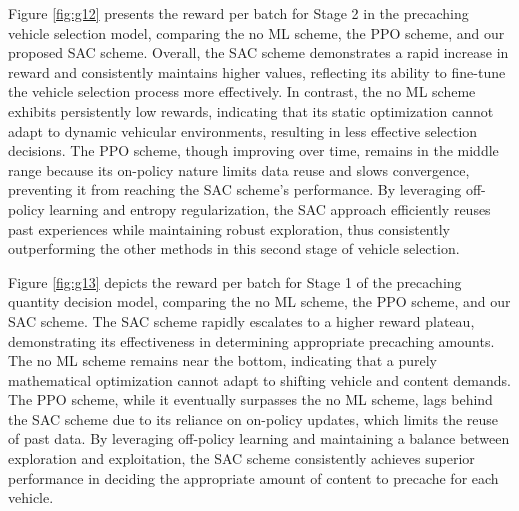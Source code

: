 \documentclass{aims}
\numberwithin{equation}{section}
\begin{document}
Figure \ref{fig:g12} presents the reward per batch for Stage 2 in the precaching vehicle selection model, comparing the no ML scheme, the PPO scheme, and our proposed SAC scheme.
Overall, the SAC scheme demonstrates a rapid increase in reward and consistently maintains higher values, reflecting its ability to fine-tune the vehicle selection process more effectively.
In contrast, the no ML scheme exhibits persistently low rewards, indicating that its static optimization cannot adapt to dynamic vehicular environments, resulting in less effective selection decisions.
The PPO scheme, though improving over time, remains in the middle range because its on-policy nature limits data reuse and slows convergence, preventing it from reaching the SAC scheme’s performance.
By leveraging off-policy learning and entropy regularization, the SAC approach efficiently reuses past experiences while maintaining robust exploration, thus consistently outperforming the other methods in this second stage of vehicle selection.

Figure \ref{fig:g13} depicts the reward per batch for Stage 1 of the precaching quantity decision model, comparing the no ML scheme, the PPO scheme, and our SAC scheme.
The SAC scheme rapidly escalates to a higher reward plateau, demonstrating its effectiveness in determining appropriate precaching amounts.
The no ML scheme remains near the bottom, indicating that a purely mathematical optimization cannot adapt to shifting vehicle and content demands.
The PPO scheme, while it eventually surpasses the no ML scheme, lags behind the SAC scheme due to its reliance on on-policy updates, which limits the reuse of past data.
By leveraging off-policy learning and maintaining a balance between exploration and exploitation, the SAC scheme consistently achieves superior performance in deciding the appropriate amount of content to precache for each vehicle.
\end{document}
